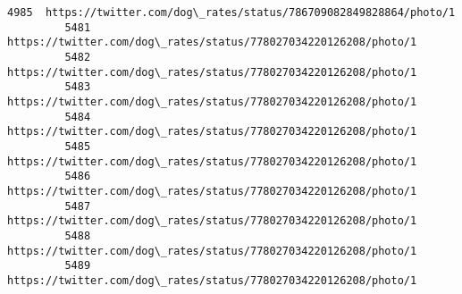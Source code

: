 \documentclass[11pt]{article}
\begin{document}
\begin{Verbatim}[commandchars=\\\{\}]
         4985  https://twitter.com/dog\_rates/status/786709082849828864/photo/1                                                                   
         5481  https://twitter.com/dog\_rates/status/778027034220126208/photo/1                                                                   
         5482  https://twitter.com/dog\_rates/status/778027034220126208/photo/1                                                                   
         5483  https://twitter.com/dog\_rates/status/778027034220126208/photo/1                                                                   
         5484  https://twitter.com/dog\_rates/status/778027034220126208/photo/1                                                                   
         5485  https://twitter.com/dog\_rates/status/778027034220126208/photo/1                                                                   
         5486  https://twitter.com/dog\_rates/status/778027034220126208/photo/1                                                                   
         5487  https://twitter.com/dog\_rates/status/778027034220126208/photo/1                                                                   
         5488  https://twitter.com/dog\_rates/status/778027034220126208/photo/1                                                                   
         5489  https://twitter.com/dog\_rates/status/778027034220126208/photo/1                                                                   
         

\end{Verbatim}
\end{document}
